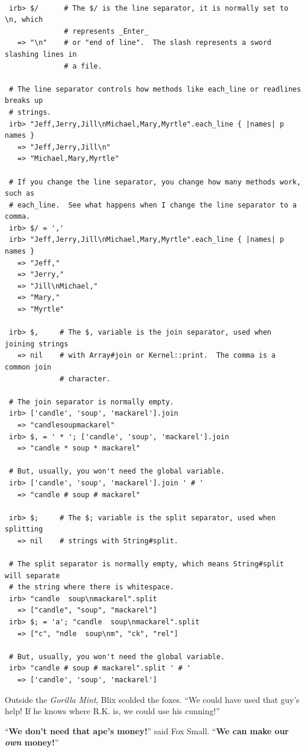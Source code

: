\documentclass[10pt,twoside]{report}
\begin{document}
\begin{lstlisting}

 irb> $/      # The $/ is the line separator, it is normally set to \n, which
              # represents _Enter_
   => "\n"    # or "end of line".  The slash represents a sword slashing lines in
              # a file.

 # The line separator controls how methods like each_line or readlines breaks up
 # strings.
 irb> "Jeff,Jerry,Jill\nMichael,Mary,Myrtle".each_line { |names| p names }
   => "Jeff,Jerry,Jill\n"
   => "Michael,Mary,Myrtle"

 # If you change the line separator, you change how many methods work, such as
 # each_line.  See what happens when I change the line separator to a comma.
 irb> $/ = ','
 irb> "Jeff,Jerry,Jill\nMichael,Mary,Myrtle".each_line { |names| p names }
   => "Jeff,"
   => "Jerry,"
   => "Jill\nMichael,"
   => "Mary,"
   => "Myrtle"

 irb> $,     # The $, variable is the join separator, used when joining strings
   => nil    # with Array#join or Kernel::print.  The comma is a common join
             # character.

 # The join separator is normally empty.
 irb> ['candle', 'soup', 'mackarel'].join
   => "candlesoupmackarel"
 irb> $, = ' * '; ['candle', 'soup', 'mackarel'].join
   => "candle * soup * mackarel"

 # But, usually, you won't need the global variable.
 irb> ['candle', 'soup', 'mackarel'].join ' # '
   => "candle # soup # mackarel"

 irb> $;     # The $; variable is the split separator, used when splitting
   => nil    # strings with String#split.

 # The split separator is normally empty, which means String#split will separate
 # the string where there is whitespace.
 irb> "candle  soup\nmackarel".split
   => ["candle", "soup", "mackarel"]
 irb> $; = 'a'; "candle  soup\nmackarel".split
   => ["c", "ndle  soup\nm", "ck", "rel"]

 # But, usually, you won't need the global variable.
 irb> "candle # soup # mackarel".split ' # '
   => ['candle', 'soup', 'mackarel']

\end{lstlisting}


Outside the {\em Gorilla Mint}, Blix scolded the foxes.  ``We could
have used that guy's help!  If he knows where R.K. is, we could use
his cunning!''

``{\bf We don't need that ape's money!}'' said Fox Small.  ``{\bf We
  can make our {\em own} money!}''
\end{document}
